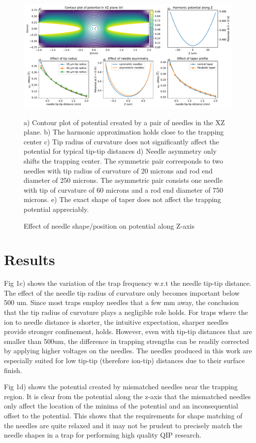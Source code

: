 \documentclass[12pt]{article}
\begin{document}
\begin{figure}
    \centering
    \includegraphics[width = \linewidth]{needle_shape_study.pdf}
    \caption{Effect of needle shape/position on potential along Z-axis}
    a) Contour plot of potential created by a pair of needles in the XZ plane. b) The harmonic approximation holds close to the trapping center c) Tip radius of curvature does not significantly affect the potential for typical tip-tip distances d) Needle asymmetry only shifts the trapping center. The symmetric pair corresponds to two needles with tip radius of curvature of 20 microns and rod end diameter of 250 microns. The asymmetric pair consists one needle with tip of curvature of 60 microns and a rod end diameter of 750 microns. e) The exact shape of taper does not affect the trapping potential appreciably.  
    \label{fig:my_label}
\end{figure}

\section{Results}
Fig 1c) shows the variation of the trap frequency w.r.t the needle tip-tip distance. 
The effect of the needle tip radius of curvature only becomes important below 500 um. 
Since most traps employ needles that a few mm away, the conclusion that the tip radius of curvature plays a negligible role holds. 
For traps where the ion to needle distance is shorter, the intuitive expectation, sharper needles provide stronger confinement, holds. 
However, even with tip-tip distances that are smaller than 500um, the difference in trapping strengths can be readily corrected by applying higher voltages on the needles. 
The needles produced in this work are especially suited for low tip-tip (therefore ion-tip) distances due to their surface finish. 

Fig 1d) shows the potential created by mismatched needles near the trapping region. 
It is clear from the potential along the z-axis that the mismatched needles only affect the location of the minima of the potential and an inconsequential offset to the potential. 
This shows that the requirements for shape matching of the needles are quite relaxed and it may not be prudent to precisely match the needle shapes in a trap for performing high quality QIP research.
\end{document}
